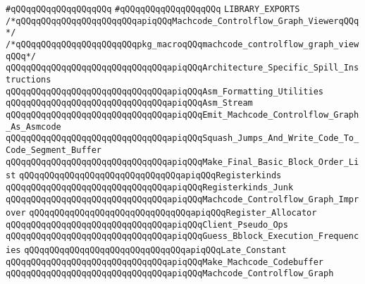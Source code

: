 \verb|#qQQqqQQqqQQqqQQqqQQq|\newline
\verb|#qQQqqQQqqQQqqQQqqQQq|\newline
\newline
\verb|LIBRARY_EXPORTS|\newline
\newline
\verb|/*qQQqqQQqqQQqqQQqqQQqqQQqapiqQQqMachcode_Controlflow_Graph_ViewerqQQq*/|\newline
\verb|/*qQQqqQQqqQQqqQQqqQQqqQQqpkg_macroqQQqmachcode_controlflow_graph_viewqQQq*/|\newline
\verb|qQQqqQQqqQQqqQQqqQQqqQQqqQQqqQQqapiqQQqArchitecture_Specific_Spill_Instructions|\newline
\verb|qQQqqQQqqQQqqQQqqQQqqQQqqQQqqQQqapiqQQqAsm_Formatting_Utilities|\newline
\verb|qQQqqQQqqQQqqQQqqQQqqQQqqQQqqQQqapiqQQqAsm_Stream|\newline
\verb|qQQqqQQqqQQqqQQqqQQqqQQqqQQqqQQqapiqQQqEmit_Machcode_Controlflow_Graph_As_Asmcode|\newline
\verb|qQQqqQQqqQQqqQQqqQQqqQQqqQQqqQQqapiqQQqSquash_Jumps_And_Write_Code_To_Code_Segment_Buffer|\newline
\verb|qQQqqQQqqQQqqQQqqQQqqQQqqQQqqQQqapiqQQqMake_Final_Basic_Block_Order_List|\newline
\verb|qQQqqQQqqQQqqQQqqQQqqQQqqQQqqQQqapiqQQqRegisterkinds|\newline
\verb|qQQqqQQqqQQqqQQqqQQqqQQqqQQqqQQqapiqQQqRegisterkinds_Junk|\newline
\verb|qQQqqQQqqQQqqQQqqQQqqQQqqQQqqQQqapiqQQqMachcode_Controlflow_Graph_Improver|\newline
\verb|qQQqqQQqqQQqqQQqqQQqqQQqqQQqqQQqapiqQQqRegister_Allocator|\newline
\verb|qQQqqQQqqQQqqQQqqQQqqQQqqQQqqQQqapiqQQqClient_Pseudo_Ops|\newline
\verb|qQQqqQQqqQQqqQQqqQQqqQQqqQQqqQQqapiqQQqGuess_Bblock_Execution_Frequencies|\newline
\verb|qQQqqQQqqQQqqQQqqQQqqQQqqQQqqQQqapiqQQqLate_Constant|\newline
\verb|qQQqqQQqqQQqqQQqqQQqqQQqqQQqqQQqapiqQQqMake_Machcode_Codebuffer|\newline
\verb|qQQqqQQqqQQqqQQqqQQqqQQqqQQqqQQqapiqQQqMachcode_Controlflow_Graph|\newline
